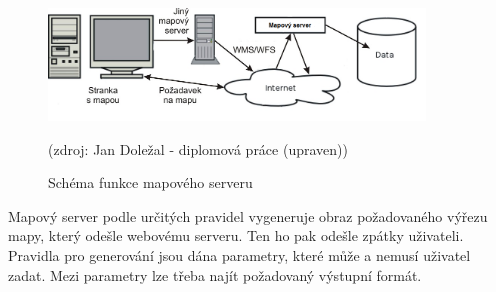 \documentclass[11pt,a4paper,titlepage,oneside]{book}
\begin{document}


		\begin{figure}[!h]
			\begin{center}
				\includegraphics[width=10cm]{obrazky/mapserver.png}
				\caption{Schéma funkce mapového serveru}
				\label{fig:server_schema}
				(zdroj: Jan Doležal - diplomová práce\cite{dp_dolezal} (upraven))
			\end{center}
		\end{figure}
Mapový server podle určitých pravidel vygeneruje obraz požadovaného výřezu mapy, který odešle webovému serveru. Ten ho pak odešle zpátky uživateli. Pravidla pro generování jsou dána parametry, které může a nemusí uživatel zadat. Mezi parametry lze třeba najít požadovaný výstupní formát.




\end{document}
